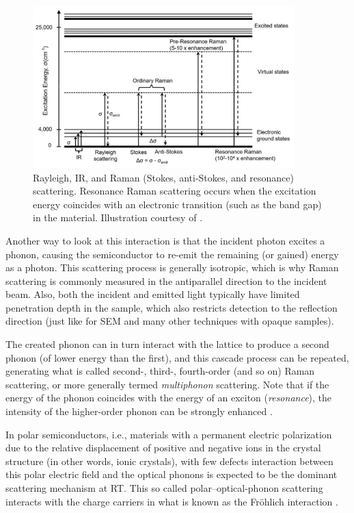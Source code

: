 \documentclass[draft,webedition,openright,titles,swedish,english]{LuaUUThesis}\usepackage[]{graphicx}\usepackage[]{xcolor}
\newcommand{\ie}{i.e.}
\begin{document}
\begin{figure}[tbp]
\centering
\includegraphics[width=0.90\textwidth]{Raman-IR-Rayleigh-energy-levels.jpg}
\caption[Rayleigh, Raman and IR scattering]{%
   Rayleigh, \protect\gls{IR}, and Raman (Stokes, anti-Stokes, and resonance) scattering.
   Resonance Raman scattering occurs when the excitation energy coincides with
   an electronic transition (such as the band gap) in the material.
   Illustration courtesy of \textcite{Qiu2019}.
}
\label{fig:0300-vibrational-energy-levels}
\end{figure}

Another way to look at this interaction is that the incident photon excites a phonon,
causing the semiconductor to re-emit the remaining (or gained) energy as a photon.
This scattering process is generally isotropic, which is why Raman scattering is
commonly measured in the antiparallel direction to the incident beam. Also, both
the incident and emitted light typically have limited penetration depth in the sample,
which also restricts detection to the reflection direction
(just like for \gls{SEM} and many other techniques with opaque samples).

The created phonon can in turn interact with the lattice to produce a second phonon
(of lower energy than the first), and this cascade process can be repeated,
generating what is called second-, third-, fourth-order (and so on) Raman scattering,
or more generally termed \emph{multiphonon} scattering.
Note that if the energy of the phonon coincides with the energy of an exciton (\emph{resonance}),
the intensity of the higher-order phonon can be strongly enhanced \cite{Pankove1975}.

In polar semiconductors, \ie, materials with a permanent electric polarization
due to the relative displacement of positive and negative ions in the crystal
structure (in other words, ionic crystals), with few defects
interaction between this polar electric field and
the optical phonons is expected to be the dominant scattering mechanism at \gls{RT}.
This so called polar--optical-phonon scattering interacts with the charge carriers
in what is known as the Fröhlich interaction \cite[p.\,40]{Stroscio2005}.
\end{document}
